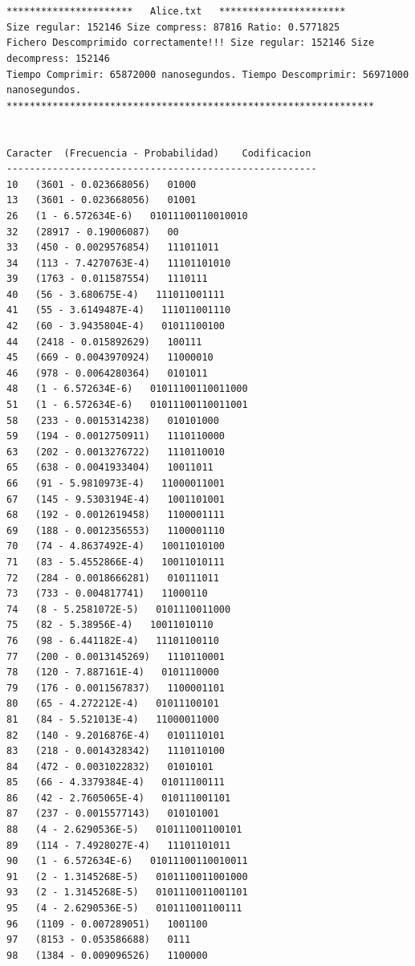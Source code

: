 \documentclass{article}
\begin{document}
\footnotesize
\begin{verbatim}
 
 
********************** 	 Alice.txt 	 **********************
Size regular: 152146 Size compress: 87816 Ratio: 0.5771825
Fichero Descomprimido correctamente!!! Size regular: 152146 Size decompress: 152146
Tiempo Comprimir: 65872000 nanosegundos. Tiempo Descomprimir: 56971000 nanosegundos.
****************************************************************


Caracter  (Frecuencia - Probabilidad) 	 Codificacion
------------------------------------------------------
10	 (3601 - 0.023668056)   01000
13	 (3601 - 0.023668056)   01001
26	 (1 - 6.572634E-6)   01011100110010010
32	 (28917 - 0.19006087)   00
33	 (450 - 0.0029576854)   111011011
34	 (113 - 7.4270763E-4)   11101101010
39	 (1763 - 0.011587554)   1110111
40	 (56 - 3.680675E-4)   111011001111
41	 (55 - 3.6149487E-4)   111011001110
42	 (60 - 3.9435804E-4)   01011100100
44	 (2418 - 0.015892629)   100111
45	 (669 - 0.0043970924)   11000010
46	 (978 - 0.0064280364)   0101011
48	 (1 - 6.572634E-6)   01011100110011000
51	 (1 - 6.572634E-6)   01011100110011001
58	 (233 - 0.0015314238)   010101000
59	 (194 - 0.0012750911)   1110110000
63	 (202 - 0.0013276722)   1110110010
65	 (638 - 0.0041933404)   10011011
66	 (91 - 5.9810973E-4)   11000011001
67	 (145 - 9.5303194E-4)   1001101001
68	 (192 - 0.0012619458)   1100001111
69	 (188 - 0.0012356553)   1100001110
70	 (74 - 4.8637492E-4)   10011010100
71	 (83 - 5.4552866E-4)   10011010111
72	 (284 - 0.0018666281)   010111011
73	 (733 - 0.004817741)   11000110
74	 (8 - 5.2581072E-5)   0101110011000
75	 (82 - 5.38956E-4)   10011010110
76	 (98 - 6.441182E-4)   11101100110
77	 (200 - 0.0013145269)   1110110001
78	 (120 - 7.887161E-4)   0101110000
79	 (176 - 0.0011567837)   1100001101
80	 (65 - 4.272212E-4)   01011100101
81	 (84 - 5.521013E-4)   11000011000
82	 (140 - 9.2016876E-4)   0101110101
83	 (218 - 0.0014328342)   1110110100
84	 (472 - 0.0031022832)   01010101
85	 (66 - 4.3379384E-4)   01011100111
86	 (42 - 2.7605065E-4)   010111001101
87	 (237 - 0.0015577143)   010101001
88	 (4 - 2.6290536E-5)   010111001100101
89	 (114 - 7.4928027E-4)   11101101011
90	 (1 - 6.572634E-6)   01011100110010011
91	 (2 - 1.3145268E-5)   0101110011001000
93	 (2 - 1.3145268E-5)   0101110011001101
95	 (4 - 2.6290536E-5)   010111001100111
96	 (1109 - 0.007289051)   1001100
97	 (8153 - 0.053586688)   0111
98	 (1384 - 0.009096526)   1100000

\end{verbatim}
\end{document}

